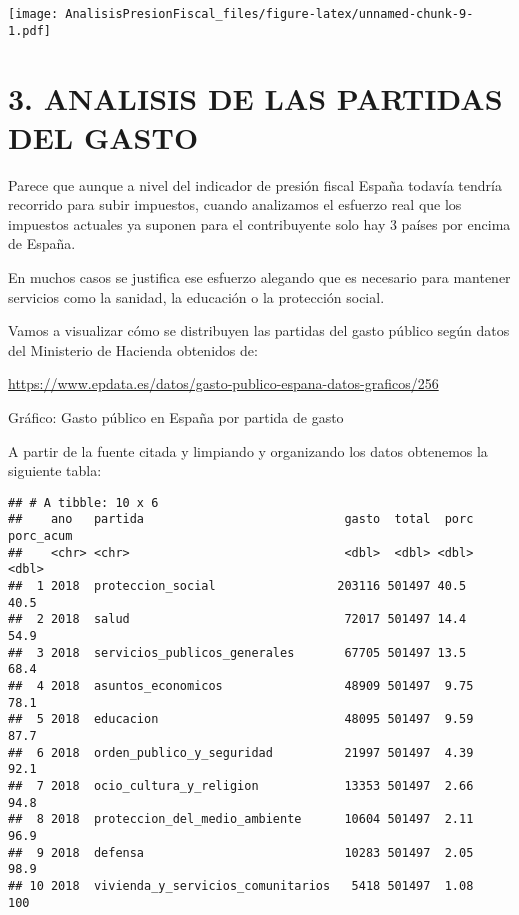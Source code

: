\documentclass[
]{article}
\begin{document}
\texttt{[image: AnalisisPresionFiscal\_files/figure-latex/unnamed-chunk-9-1.pdf]}

\pagebreak

\hypertarget{analisis-de-las-partidas-del-gasto}{%
\section{3. ANALISIS DE LAS PARTIDAS DEL
GASTO}\label{analisis-de-las-partidas-del-gasto}}

Parece que aunque a nivel del indicador de presión fiscal España todavía
tendría recorrido para subir impuestos, cuando analizamos el esfuerzo
real que los impuestos actuales ya suponen para el contribuyente solo
hay 3 países por encima de España.

En muchos casos se justifica ese esfuerzo alegando que es necesario para
mantener servicios como la sanidad, la educación o la protección social.

Vamos a visualizar cómo se distribuyen las partidas del gasto público
según datos del Ministerio de Hacienda obtenidos de:

\url{https://www.epdata.es/datos/gasto-publico-espana-datos-graficos/256}

Gráfico: Gasto público en España por partida de gasto

A partir de la fuente citada y limpiando y organizando los datos
obtenemos la siguiente tabla:

\begin{verbatim}
## # A tibble: 10 x 6
##    ano   partida                            gasto  total  porc porc_acum
##    <chr> <chr>                              <dbl>  <dbl> <dbl>     <dbl>
##  1 2018  proteccion_social                 203116 501497 40.5       40.5
##  2 2018  salud                              72017 501497 14.4       54.9
##  3 2018  servicios_publicos_generales       67705 501497 13.5       68.4
##  4 2018  asuntos_economicos                 48909 501497  9.75      78.1
##  5 2018  educacion                          48095 501497  9.59      87.7
##  6 2018  orden_publico_y_seguridad          21997 501497  4.39      92.1
##  7 2018  ocio_cultura_y_religion            13353 501497  2.66      94.8
##  8 2018  proteccion_del_medio_ambiente      10604 501497  2.11      96.9
##  9 2018  defensa                            10283 501497  2.05      98.9
## 10 2018  vivienda_y_servicios_comunitarios   5418 501497  1.08     100
\end{verbatim}

\pagebreak
\end{document}

